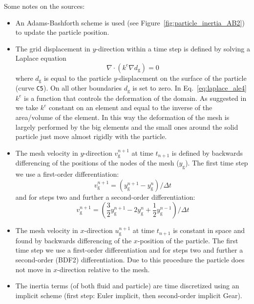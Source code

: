 Some notes on the sources:
\begin{itemize}
   \item An Adams-Bashforth
scheme is used (see Figure~\ref{fig:particle_inertia_AB2}) to update the
particle position.
   \item The grid displacement in $y$-direction within a time step
    is defined by solving a Laplace equation
   \begin{equation}
      \nabla\cdot(k^e \nabla d_\text{g})= 0 \label{eq:laplace_ale4}
   \end{equation}
     where $d_\text{g}$ is equal to the particle $y$-displacement
     on the surface
     of the particle (curve \texttt{C5}). On all other boundaries 
     $d_\text{g}$ is set to zero.
     In Eq.~\eqref{eq:laplace_ale4} 
   $k^e$ is a function that controls the deformation of the domain.
   As suggested in \cite{Hu2001} we take $k^e$ 
   constant on an element and equal to the inverse of the
     area/volume of the element. In this way the deformation of the mesh is
largely performed by the big elements and the small ones around the solid
particle just move almost rigidly with the particle.
   \item The mesh velocity in $y$-direction $v^{n+1}_\text{g}$ at time 
    $t_{n+1}$ is defined by backwards
   differencing of the positions of the nodes of the mesh ($y_\text{g}$).
   The first time step we use a first-order differentiation:
\begin{equation}
  v^{n+1}_\text{g}=(y^{n+1}_\text{g} - y^{n}_\text{g})/\Delta t
\end{equation}
   and for steps two and further a second-order differentiation:
\begin{equation}
  v^{n+1}_\text{g}=(\frac32 y^{n+1}_\text{g} - 2 y^{n}_\text{g}
            +\frac12 y^{n-1}_\text{g})/\Delta t
\end{equation}
   \item The mesh velocity in $x$-direction $u^{n+1}_\text{g}$ at time 
    $t_{n+1}$ is constant in space and found by backwards
   differencing of the $x$-position of the particle.
   The first time step we use a first-order differentiation
   and for steps two and further a second-order (BDF2) differentiation.
   Due to this procedure the particle does not move in $x$-direction relative
   to the mesh.
  \item The inertia terms (of both fluid and particle)
        are time discretized using an implicit scheme (first
        step: Euler implicit, then second-order implicit Gear).

\end{itemize}
